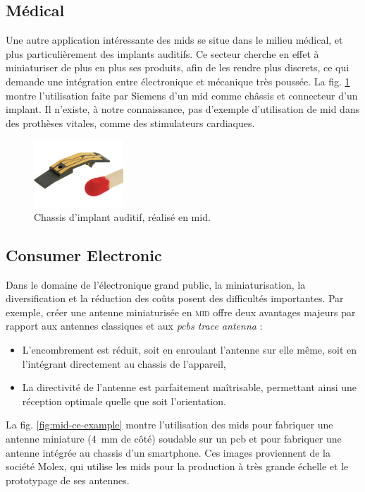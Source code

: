 \subsection{Médical}
Une autre application intéressante des \glspl{mid} se situe dans le milieu médical, et plus particulièrement des implants auditifs.
Ce secteur cherche en effet à miniaturiser de plus en plus ses produits, afin de les rendre plus discrets, ce qui demande une intégration entre électronique et mécanique très poussée.
La fig. \ref{fig:mid-siemens-example} montre l'utilisation faite par Siemens d'un \gls{mid} comme châssis et connecteur d'un implant.
Il n'existe, à notre connaissance, pas d'exemple d'utilisation de \gls{mid} dans des prothèses vitales, comme des stimulateurs cardiaques.


\begin{figure}[h]
    \begin{center}
        \includegraphics[width=0.3\textwidth]{images/mid-hearing-aid_RED}
        \caption{Chassis d'implant auditif, réalisé en \gls{mid}.}
        \label{fig:mid-siemens-example}
    \end{center}
\end{figure}

\subsection{Consumer Electronic}
Dans le domaine de l'électronique grand public, la miniaturisation, la diversification et la réduction des coûts posent des difficultés importantes.
Par exemple, créer une antenne miniaturisée en \textsc{mid} offre deux avantages majeurs par rapport aux antennes classiques et aux \textit{\glspl{pcb} trace antenna} :
\begin{itemize}
    \item L'encombrement est réduit, soit en enroulant l'antenne sur elle même, soit en l'intégrant directement au chassis de l'appareil,
    \item La directivité de l'antenne est parfaitement maîtrisable, permettant ainsi une réception optimale quelle que soit l'orientation.
\end{itemize}
La fig. \ref{fig:mid-ce-example} montre l'utilisation des \glspl{mid} pour fabriquer une antenne miniature (\SI{4}{\milli\meter} de côté) soudable sur un \gls{pcb} et pour fabriquer une antenne intégrée au chassis d'un smartphone.
Ces images proviennent de la société Molex, qui utilise les \glspl{mid} pour la production à très grande échelle et le prototypage de ses antennes.

